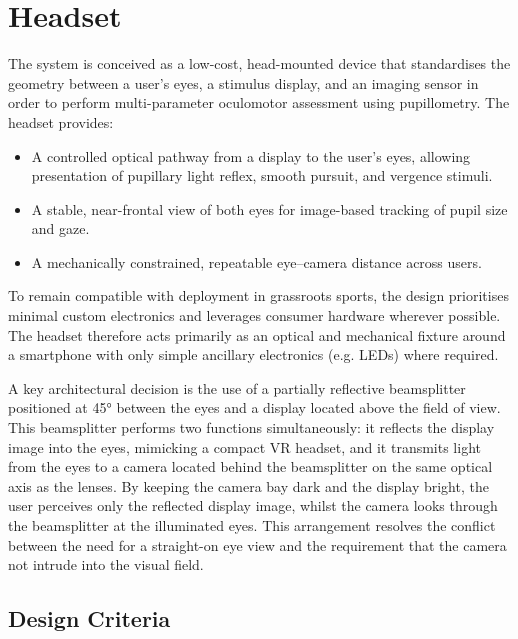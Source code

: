 \chapter{Headset}
\label{chapter:headset}

The system is conceived as a low-cost, head-mounted device that standardises the geometry between a user's eyes, a stimulus display, and an imaging sensor in order to perform multi-parameter oculomotor assessment using pupillometry. The headset provides:

\begin{itemize}
    \item A controlled optical pathway from a display to the user's eyes, allowing presentation of pupillary light reflex, smooth pursuit, and vergence stimuli.

    \item A stable, near-frontal view of both eyes for image-based tracking of pupil size and gaze.

    \item A mechanically constrained, repeatable eye--camera distance across users.
\end{itemize}

To remain compatible with deployment in grassroots sports, the design prioritises minimal custom electronics and leverages consumer hardware wherever possible. The headset therefore acts primarily as an optical and mechanical fixture around a smartphone with only simple ancillary electronics (e.g. LEDs) where required.

A key architectural decision is the use of a partially reflective beamsplitter positioned at 45° between the eyes and a display located above the field of view. This beamsplitter performs two functions simultaneously: it reflects the display image into the eyes, mimicking a compact VR headset, and it transmits light from the eyes to a camera located behind the beamsplitter on the same optical axis as the lenses. By keeping the camera bay dark and the display bright, the user perceives only the reflected display image, whilst the camera looks through the beamsplitter at the illuminated eyes. This arrangement resolves the conflict between the need for a straight-on eye view and the requirement that the camera not intrude into the visual field.


\section{Design Criteria}

